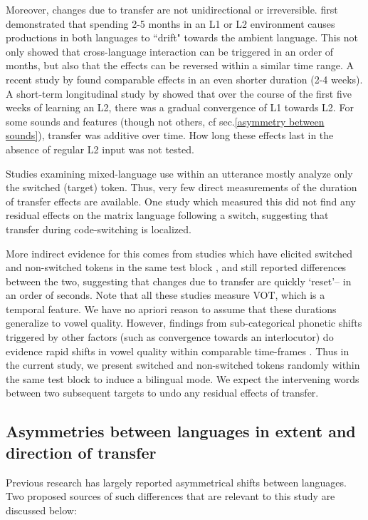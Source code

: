 \documentclass[charis,linguex]{glossa}
\begin{document}
Moreover, changes due to transfer are not unidirectional or irreversible. \cite{sancier1997gestural} first demonstrated that spending 2-5 months in an L1 or L2 environment causes productions in both languages to ``drift" towards the ambient language. This not only showed that cross-language interaction can be triggered in an order of months, but also that the effects can be reversed within a similar time range. A recent study by \cite{tobin2017phonetic} found comparable effects in an even shorter duration (2-4 weeks). A short-term longitudinal study by \cite{chang2012rapid} showed that over the course of the first five weeks of learning an L2, there was a gradual convergence of L1 towards L2. For some sounds and features (though not others, cf sec.\ref{asymmetry between sounds}), transfer was additive over time. How long these effects last in the absence of regular L2 input was not tested. 

Studies examining mixed-language use within an utterance mostly analyze only the switched (target) token. Thus, very few direct measurements of the duration of transfer effects are available. One study which measured this \citep{bullock2009trying} did not find any residual effects on the matrix language following a switch, suggesting that transfer during code-switching is localized.  

More indirect evidence for this comes from studies which have elicited switched and non-switched tokens in the same test block \citep{tsui2019impact,olson2013bilingual}, and still reported differences between the two, suggesting that changes due to transfer are quickly `reset'-- in an order of seconds. Note that all these studies measure VOT, which is a temporal feature. We have no apriori reason to assume that these durations generalize to vowel quality. However, findings from sub-categorical phonetic shifts triggered by other factors (such as convergence towards an interlocutor) do evidence rapid shifts in vowel quality within comparable time-frames \citep{pardo2010expressing,babel2010dialect,babel2012evidence}. Thus in the current study, we present switched and non-switched tokens randomly within the same test block to induce a bilingual mode. We expect the intervening words between two subsequent targets to undo any residual effects of transfer.


\subsection{Asymmetries between languages in extent and direction of transfer} \label{asymmetries}
Previous research has largely reported asymmetrical shifts between languages. Two proposed sources of such differences that are relevant to this study are discussed below: 
\end{document}
